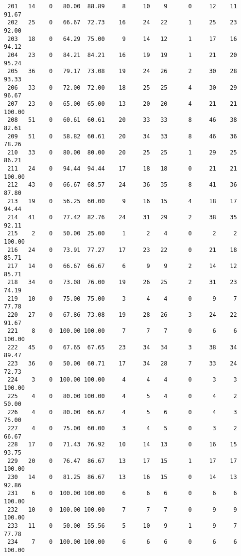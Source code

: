 \begin{verbatim}
 201   14    0   80.00  88.89     8     10    9      0     12    11    91.67
 202   25    0   66.67  72.73    16     24   22      1     25    23    92.00
 203   18    0   64.29  75.00     9     14   12      1     17    16    94.12
 204   23    0   84.21  84.21    16     19   19      1     21    20    95.24
 205   36    0   79.17  73.08    19     24   26      2     30    28    93.33
 206   33    0   72.00  72.00    18     25   25      4     30    29    96.67
 207   23    0   65.00  65.00    13     20   20      4     21    21   100.00
 208   51    0   60.61  60.61    20     33   33      8     46    38    82.61
 209   51    0   58.82  60.61    20     34   33      8     46    36    78.26
 210   33    0   80.00  80.00    20     25   25      1     29    25    86.21
 211   24    0   94.44  94.44    17     18   18      0     21    21   100.00
 212   43    0   66.67  68.57    24     36   35      8     41    36    87.80
 213   19    0   56.25  60.00     9     16   15      4     18    17    94.44
 214   41    0   77.42  82.76    24     31   29      2     38    35    92.11
 215    2    0   50.00  25.00     1      2    4      0      2     2   100.00
 216   24    0   73.91  77.27    17     23   22      0     21    18    85.71
 217   14    0   66.67  66.67     6      9    9      2     14    12    85.71
 218   34    0   73.08  76.00    19     26   25      2     31    23    74.19
 219   10    0   75.00  75.00     3      4    4      0      9     7    77.78
 220   27    0   67.86  73.08    19     28   26      3     24    22    91.67
 221    8    0  100.00 100.00     7      7    7      0      6     6   100.00
 222   45    0   67.65  67.65    23     34   34      3     38    34    89.47
 223   36    0   50.00  60.71    17     34   28      7     33    24    72.73
 224    3    0  100.00 100.00     4      4    4      0      3     3   100.00
 225    4    0   80.00 100.00     4      5    4      0      4     2    50.00
 226    4    0   80.00  66.67     4      5    6      0      4     3    75.00
 227    4    0   75.00  60.00     3      4    5      0      3     2    66.67
 228   17    0   71.43  76.92    10     14   13      0     16    15    93.75
 229   20    0   76.47  86.67    13     17   15      1     17    17   100.00
 230   14    0   81.25  86.67    13     16   15      0     14    13    92.86
 231    6    0  100.00 100.00     6      6    6      0      6     6   100.00
 232   10    0  100.00 100.00     7      7    7      0      9     9   100.00
 233   11    0   50.00  55.56     5     10    9      1      9     7    77.78
 234    7    0  100.00 100.00     6      6    6      0      6     6   100.00

\end{verbatim}
